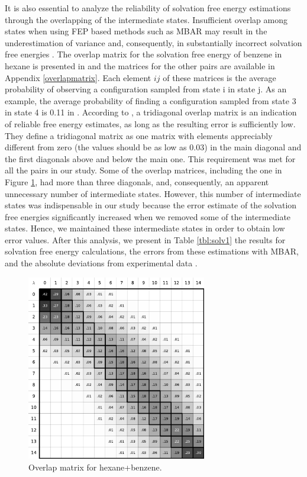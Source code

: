 \FloatBarrier
It is also essential to analyze the reliability of solvation free energy estimations through the overlapping of the intermediate states. Insufficient overlap among states when using FEP based methods such as MBAR may result in the underestimation of variance and, consequently, in substantially incorrect solvation free energies \cite{klimovich}. The overlap matrix for the solvation free energy of benzene in hexane is presented in  and the matrices for the other pairs are available in Appendix \ref{overlapmatrix}. Each element $ij$ of these matrices is the average probability of observing a configuration sampled from state i in state j. As an example, the average probability of finding a configuration sampled from state 3 in state 4 is 0.11 in . According to , a tridiagonal overlap matrix is an indication of reliable free energy estimates, as long as the resulting error is sufficiently low. They define a tridiagonal matrix as one matrix with elements appreciably different from zero (the values should be as low as 0.03) in the main diagonal and the first diagonals above and below the main one. This requirement was met for all the pairs in our study. Some of the overlap matrices, including the one in Figure \ref{fig:hexove}, had more than three diagonals, and, consequently, an apparent unnecessary number of intermediate states. However, this number of intermediate states was indispensable in our study because the error estimate of the solvation free energies significantly increased when we removed some of the intermediate states. Hence, we maintained these intermediate states in order to obtain low error values. After this analysis, we present in Table \ref{tbl:solv1} the results for solvation free energy calculations, the errors from these estimations with MBAR, and the absolute deviations from experimental data \cite{doi:10.1021/ci034120c}.  

\begin{figure}[h]
	\centering
	\includegraphics[width=0.7\textwidth]{Figures/ohex_benz}
	\caption{Overlap matrix for hexane+benzene.}
	\label{fig:hexove}
\end{figure}

